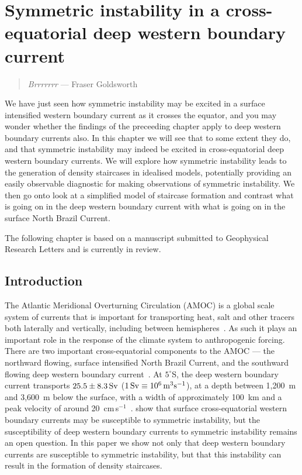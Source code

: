 \chapter{Symmetric instability in a cross-equatorial deep western boundary current}
\begin{quote}
    \textit{Brrrrrrr} --- Fraser Goldsworth
\end{quote}

We have just seen how symmetric instability may be excited in a surface intensified western boundary current as it crosses the equator, and you may wonder whether the findings of the preceeding chapter apply to deep western boundary currents also. In this chapter we will see that to some extent they do, and that symmetric instability may indeed be excited in cross-equatorial deep western boundary currents. We will explore how symmetric instability leads to the generation of density staircases in idealised models, potentially providing an easily observable diagnostic for making observations of symmetric instability. We then go onto look at a simplified model of staircase formation and contrast what is going on in the deep western boundary current with what is going on in the surface North Brazil Current.

The following chapter is based on a manuscript submitted to Geophysical Research Letters and is currently in review.

\section{Introduction}
The Atlantic Meridional Overturning Circulation (AMOC) is a global scale system of currents that is important for transporting heat, salt and other tracers both laterally and vertically, including between hemispheres~\citep{Jackson2015}. As such it plays an important role in the response of the climate system to anthropogenic forcing. There are two important cross-equatorial components to the AMOC --- the northward flowing, surface intensified North Brazil Current, and the southward flowing deep western boundary current~\citep{Bower2019}. At $5^\circ$S, the deep western boundary current transports $25.5 \pm 8.3 \, {\rm Sv}$ ($1 \, {\rm Sv} \equiv 10^6 \, {\rm m^3 s^{-1}}$), at a depth between 1,200~m and 3,600~m below the surface, with a width of approximately 100~km and a peak velocity of around 20~cm$\,$s$^{-1}$~\citep{Schott2005}. \citet{Goldsworth2021} show that surface cross-equatorial western boundary currents may be susceptible to symmetric instability, but the susceptibility of deep western boundary currents to symmetric instability remains an open question. In this paper we show not only that deep western boundary currents are susceptible to symmetric instability, but that this instability can result in the formation of density staircases.


